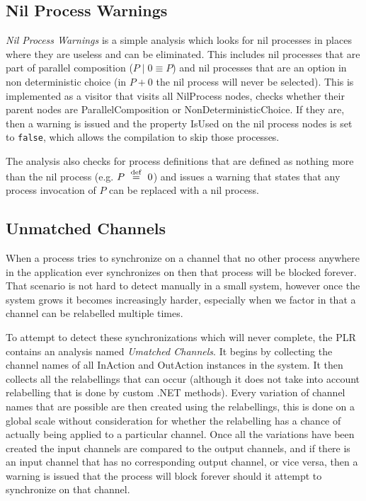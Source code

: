 \subsection{Nil Process Warnings}

	\textit{Nil Process Warnings} is a simple analysis which looks for nil 
	processes in places where they are useless and can be eliminated. This 
	includes nil processes that are part of parallel composition ($P \mid 0 
	\equiv P$) and nil processes that are an option in non deterministic choice 
	(in $P+0$ the nil process will never be selected). This is implemented as a 
	visitor that visits all \textsf{NilProcess} nodes, checks whether their 
	parent nodes are \textsf{ParallelComposition} or 
	\textsf{NonDeterministicChoice}. If they are, then a warning is issued and 
	the property \textsf{IsUsed} on the nil process nodes is set to 
	\texttt{false}, which allows the compilation to skip those processes.
	
	The analysis also checks for process definitions that are defined as nothing 
	more than the nil process (e.g. $P \ \stackrel{\mathrm{def}}{=}\  0$) and issues a warning that 
	states that any process invocation of $P$ can be replaced with a nil process.

\subsection{Unmatched Channels}

	When a process tries to synchronize on a channel that no other process 
	anywhere in the application ever synchronizes on then that process will be 
	blocked forever. That scenario is not hard to detect manually in a small 
	system, however once the system grows it becomes increasingly harder, 
	especially when we factor in that a channel can be relabelled multiple 
	times. 
	
	To attempt to detect these synchronizations which will never complete, the 
	PLR contains an analysis named \textit{Umatched Channels}. It begins by
	collecting the channel names of all \textsf{InAction} and \textsf{OutAction}
	instances in the system. It then collects all the relabellings that can occur
	(although it does not take into account relabelling that is done by custom
	.NET methods). Every variation of channel names that are possible are then
	created using the relabellings, this is done on a global scale without 
	consideration for whether the relabelling has a chance of actually being
	applied to a particular channel. Once all the variations have been created
	the input channels are compared to the output channels, and if there is
	an input channel that has no corresponding output channel, or vice versa,
	then a warning is issued that the process will block forever should it 
	attempt to synchronize on that channel. 
	
